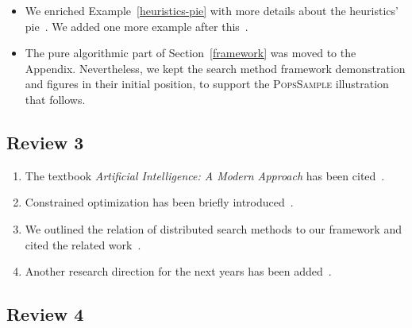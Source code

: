 \documentclass{ws-ijait}
\begin{document}
\begin{itemize}
  \item We enriched Example~\ref{heuristics-pie} with more
        details about the heuristics' pie~. We
        added one more example after this~.
  \item The pure algorithmic part of Section~\ref{framework}
        was moved to the Appendix. Nevertheless, we kept the
        search method framework demonstration and figures in
        their initial position, to support the
        \textsc{PopsSample} illustration that follows.
\end{itemize}

\subsection*{Review 3}

\begin{enumerate}
  \item The textbook \emph{Artificial Intelligence: A Modern
        Approach} has been cited~.
  \item Constrained optimization has been briefly
        introduced~.
  \item We outlined the relation of distributed search
        methods to our framework and cited the related
        work~.
  \item Another research direction for the next years has
        been added~.
\end{enumerate}

\subsection*{Review 4}
\end{document}

